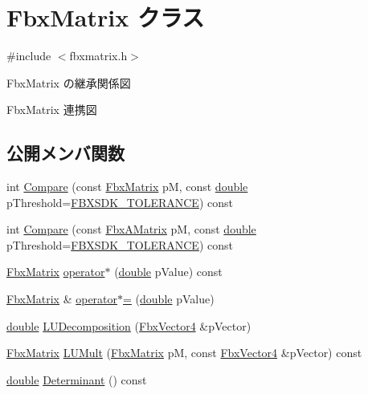 \hypertarget{class_fbx_matrix}{}\section{Fbx\+Matrix クラス}
\label{class_fbx_matrix}


{\ttfamily \#include $<$fbxmatrix.\+h$>$}



Fbx\+Matrix の継承関係図


Fbx\+Matrix 連携図
\subsection*{公開メンバ関数}
\begin{DoxyCompactItemize}
\item 
int \hyperlink{class_fbx_matrix_a4a2be0a35135b34744cb909d98c54993}{Compare} (const \hyperlink{class_fbx_matrix}{Fbx\+Matrix} pM, const \hyperlink{class_fbx_matrix_a01f8be57393e5d9973b23897c29d5520}{double} p\+Threshold=\hyperlink{fbxtypes_8h_acf3cd6f208edb42ad9c9abbc1f7feea0}{F\+B\+X\+S\+D\+K\+\_\+\+T\+O\+L\+E\+R\+A\+N\+CE}) const
\item 
int \hyperlink{class_fbx_matrix_af70d97ac4256207042f4aeb933bfae99}{Compare} (const \hyperlink{class_fbx_a_matrix}{Fbx\+A\+Matrix} pM, const \hyperlink{class_fbx_matrix_a01f8be57393e5d9973b23897c29d5520}{double} p\+Threshold=\hyperlink{fbxtypes_8h_acf3cd6f208edb42ad9c9abbc1f7feea0}{F\+B\+X\+S\+D\+K\+\_\+\+T\+O\+L\+E\+R\+A\+N\+CE}) const
\item 
\hyperlink{class_fbx_matrix}{Fbx\+Matrix} \hyperlink{class_fbx_matrix_a456c331260776abbc6773ce327437cac}{operator$\ast$} (\hyperlink{class_fbx_matrix_a01f8be57393e5d9973b23897c29d5520}{double} p\+Value) const
\item 
\hyperlink{class_fbx_matrix}{Fbx\+Matrix} \& \hyperlink{class_fbx_matrix_a29c75e711021d29d9b046f7f0b5119cf}{operator$\ast$=} (\hyperlink{class_fbx_matrix_a01f8be57393e5d9973b23897c29d5520}{double} p\+Value)
\item 
\hyperlink{class_fbx_matrix_a01f8be57393e5d9973b23897c29d5520}{double} \hyperlink{class_fbx_matrix_a54c603f422d3a39bdf0bc6c4f3e14436}{L\+U\+Decomposition} (\hyperlink{class_fbx_vector4}{Fbx\+Vector4} \&p\+Vector)
\item 
\hyperlink{class_fbx_matrix}{Fbx\+Matrix} \hyperlink{class_fbx_matrix_ab6757b8b980b7408507a8fe95a954872}{L\+U\+Mult} (\hyperlink{class_fbx_matrix}{Fbx\+Matrix} pM, const \hyperlink{class_fbx_vector4}{Fbx\+Vector4} \&p\+Vector) const
\item 
\hyperlink{class_fbx_matrix_a01f8be57393e5d9973b23897c29d5520}{double} \hyperlink{class_fbx_matrix_add2807a6e072d224b95ec69f584a3600}{Determinant} () const
\end{DoxyCompactItemize}
